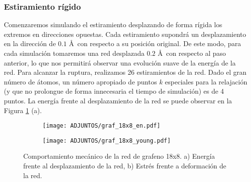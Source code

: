 \subsubsection{Estiramiento rígido} \label{er}
Comenzaremos simulando el estiramiento desplazando de forma rígida los extremos en direcciones opuestas. Cada estiramiento supondrá un desplazamiento en la dirección \arm de $0.1$ \AA \ con respecto a su posición original. De este modo, para cada simulación tomaremos una red desplazada $0.2$ \AA \ con respecto al paso anterior, lo que nos permitirá observar una evolución suave de la energía de la red. Para alcanzar la ruptura, realizamos 26 estiramientos de la red. Dado el gran número de átomos, un número apropiado de puntos $k$ especiales para la relajación (y que no prolongue de forma innecesaria el tiempo de simulación) es de 4 puntos. La energía frente al desplazamiento de la red se puede observar en la Figura \ref{fig:4.5} (a). 
\begin{figure}[!h]
    \centering
    \begin{subfigure}{0.5\textwidth}
        \caption{}
        \texttt{[image: ADJUNTOS/graf\_18x8\_en.pdf]}
    \end{subfigure}
    \begin{subfigure}{0.487\textwidth}
        \caption{}
        \texttt{[image: ADJUNTOS/graf\_18x8\_young.pdf]}
    \end{subfigure}
    \caption{Comportamiento mecánico de la red de grafeno 18x8. a) Energía frente al desplazamiento de la red, b) Estrés frente a deformación de la red. }
    \label{fig:4.5}
\end{figure}

